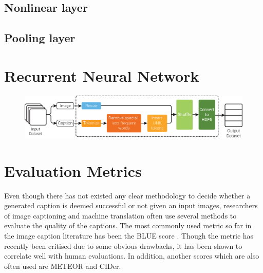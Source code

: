 \subsection{Nonlinear layer}

\subsection{Pooling layer}

\section{Recurrent Neural Network}

\begin{figure}
	\includegraphics[width=\linewidth]{Chapters/Fig/data_preprocessor.eps}
\end{figure}



\section{Evaluation Metrics}
\label{sec:chap4_metric}
Even though there has not existed any clear methodology to decide whether a generated caption is deemed successful or not given an input images, researchers of image captioning and machine translation often use several methods to evaluate the quality of the captions. The most commonly used metric so far in the image caption literature has been the BLUE score \cite{Papineni:2002:BMA:1073083.1073135}. Though the metric has recently been critised due to some obvious drawbacks, it has been shown to correlate well with human evaluations. In addition, another scores which are also often used are METEOR and CIDer.

